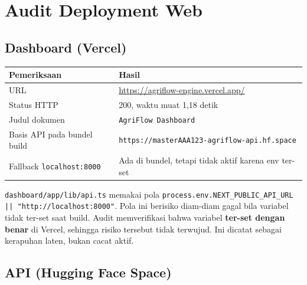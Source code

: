 \documentclass[11pt,a4paper]{article}
\newcommand{\code}[1]{\texttt{\small #1}}
\begin{document}
\section{Audit Deployment Web}

\subsection{Dashboard (Vercel)}

\begin{center}
\begin{tabular}{@{}p{4.6cm}p{10.4cm}@{}}
\toprule
\textbf{Pemeriksaan} & \textbf{Hasil} \\
\midrule
URL & \url{https://agriflow-engine.vercel.app/} \\
Status HTTP & 200, waktu muat 1,18 detik \\
Judul dokumen & \code{AgriFlow Dashboard} \\
Basis API pada bundel build & \code{https://masterAAA123-agriflow-api.hf.space} \\
Fallback \code{localhost:8000} & Ada di bundel, tetapi tidak aktif karena env ter-set \\
\bottomrule
\end{tabular}
\end{center}

\noindent
\code{dashboard/app/lib/api.ts} memakai pola \code{process.env.NEXT\_PUBLIC\_API\_URL ||
"http://localhost:8000"}. Pola ini berisiko diam-diam gagal bila variabel tidak ter-set saat
build. Audit memverifikasi bahwa variabel \textbf{ter-set dengan benar} di Vercel, sehingga
risiko tersebut tidak terwujud. Ini dicatat sebagai kerapuhan laten, bukan cacat aktif.

\subsection{API (Hugging Face Space)}
\end{document}
